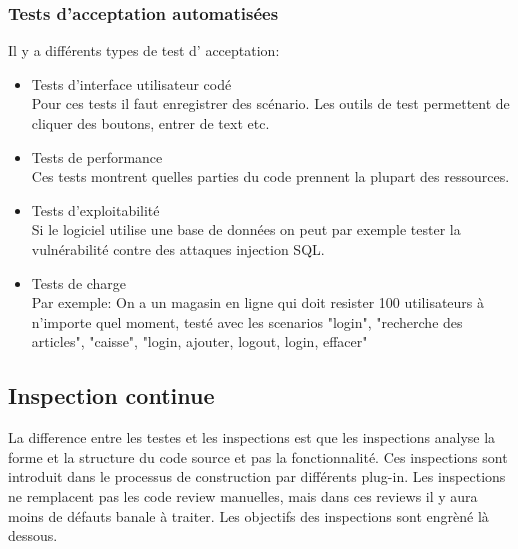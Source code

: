 \subsubsection{Tests d'acceptation automatisées}
Il y a différents types de test d' acceptation:
\begin{itemize}
 \item Tests d'interface utilisateur codé
 \\Pour ces tests il faut enregistrer des scénario. Les outils de test permettent de cliquer des boutons, entrer de text etc. 
 \item Tests de performance
 \\Ces tests montrent quelles parties du code prennent la plupart des ressources.
 \item Tests d'exploitabilité 
 \\Si le logiciel utilise une base de données on peut par exemple tester la vulnérabilité contre des attaques injection SQL.
 \item Tests de charge
 \\Par exemple: On a un magasin en ligne qui doit resister 100 utilisateurs à n'importe quel moment, testé avec les scenarios "login", "recherche des articles", "caisse", "login, ajouter, logout, login, effacer"
\end{itemize}





\subsection{Inspection continue}

La difference entre les testes et les inspections est que les inspections analyse la forme et la structure du code source et pas la fonctionnalité. Ces inspections sont introduit dans le processus de construction par différents plug-in. Les inspections ne remplacent pas les code review manuelles, mais dans ces reviews il y aura moins de défauts banale à traiter. Les objectifs des inspections sont engrèné là dessous.

